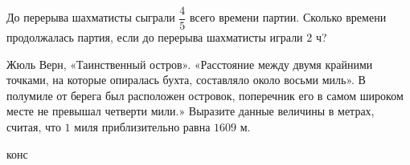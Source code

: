 \begin{class}[number=8]
\begin{listofex}
		\item До перерыва шахматисты сыграли \( \dfrac{4}{5} \) всего времени партии. Сколько времени  продолжалась партия, если до перерыва шахматисты играли 2 ч?
		\item Жюль Верн, «Таинственный остров». «Расстояние между двумя крайними точками, на которые опиралась бухта, составляло около восьми миль». В полумиле от берега был расположен островок, поперечник его в самом широком месте не превышал четверти мили.» Выразите данные величины в метрах, считая, что \( 1 \) миля приблизительно равна \( 1609 \) м.
	
	\end{listofex}
\end{class}

\begin{consultation}
	\begin{listofex}
		\item конс
	\end{listofex}
\end{consultation}
